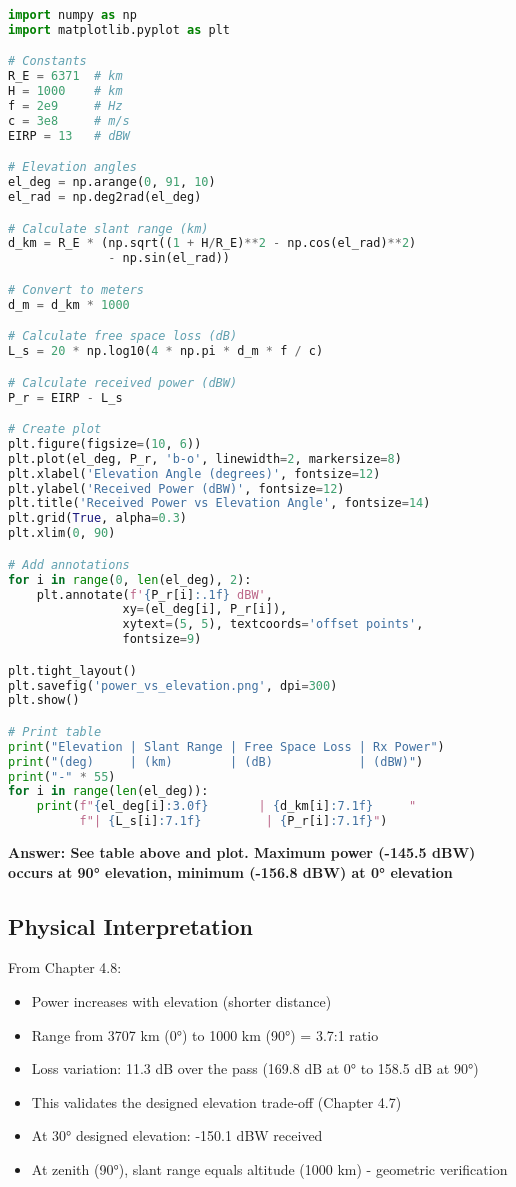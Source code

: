 \documentclass[11pt,letterpaper]{article}
\begin{document}
\begin{lstlisting}[language=Python, basicstyle=\small, frame=single]
import numpy as np
import matplotlib.pyplot as plt

# Constants
R_E = 6371  # km
H = 1000    # km
f = 2e9     # Hz
c = 3e8     # m/s
EIRP = 13   # dBW

# Elevation angles
el_deg = np.arange(0, 91, 10)
el_rad = np.deg2rad(el_deg)

# Calculate slant range (km)
d_km = R_E * (np.sqrt((1 + H/R_E)**2 - np.cos(el_rad)**2)
              - np.sin(el_rad))

# Convert to meters
d_m = d_km * 1000

# Calculate free space loss (dB)
L_s = 20 * np.log10(4 * np.pi * d_m * f / c)

# Calculate received power (dBW)
P_r = EIRP - L_s

# Create plot
plt.figure(figsize=(10, 6))
plt.plot(el_deg, P_r, 'b-o', linewidth=2, markersize=8)
plt.xlabel('Elevation Angle (degrees)', fontsize=12)
plt.ylabel('Received Power (dBW)', fontsize=12)
plt.title('Received Power vs Elevation Angle', fontsize=14)
plt.grid(True, alpha=0.3)
plt.xlim(0, 90)

# Add annotations
for i in range(0, len(el_deg), 2):
    plt.annotate(f'{P_r[i]:.1f} dBW',
                xy=(el_deg[i], P_r[i]),
                xytext=(5, 5), textcoords='offset points',
                fontsize=9)

plt.tight_layout()
plt.savefig('power_vs_elevation.png', dpi=300)
plt.show()

# Print table
print("Elevation | Slant Range | Free Space Loss | Rx Power")
print("(deg)     | (km)        | (dB)            | (dBW)")
print("-" * 55)
for i in range(len(el_deg)):
    print(f"{el_deg[i]:3.0f}       | {d_km[i]:7.1f}     "
          f"| {L_s[i]:7.1f}         | {P_r[i]:7.1f}")
\end{lstlisting}

\textbf{Answer: See table above and plot. Maximum power (-145.5 dBW) occurs at 90° elevation, minimum (-156.8 dBW) at 0° elevation}

\subsection{Physical Interpretation}
From Chapter 4.8:
\begin{itemize}
    \item Power increases with elevation (shorter distance)
    \item Range from 3707 km (0°) to 1000 km (90°) = 3.7:1 ratio
    \item Loss variation: 11.3 dB over the pass (169.8 dB at 0° to 158.5 dB at 90°)
    \item This validates the designed elevation trade-off (Chapter 4.7)
    \item At 30° designed elevation: -150.1 dBW received
    \item At zenith (90°), slant range equals altitude (1000 km) - geometric verification
\end{itemize}
\end{document}
